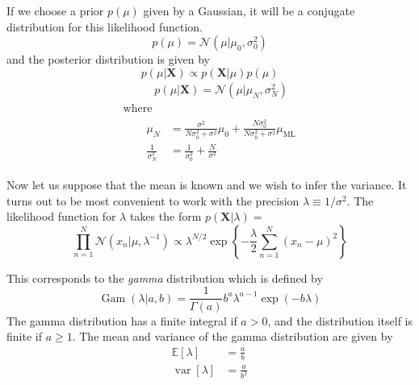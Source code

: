 \documentclass[5p,sort&compress]{elsarticle}
\begin{document}
If we choose a prior $p(\mu)$ given by a Gaussian, it will be a conjugate distribution for this likelihood function. 
\begin{equation}
p(\mu) =\mathcal{N}\left(\mu | \mu_{0}, \sigma_{0}^{2}\right)
\end{equation}
and the posterior distribution is given by
\begin{equation}
p(\mu | \mathbf{X}) \propto p(\mathbf{X} | \mu) p(\mu) 
\end{equation}
\begin{equation}
\begin{array}{l}{~~~~~\qquad p(\mu | \mathbf{X})=\mathcal{N}\left(\mu | \mu_{N}, \sigma_{N}^{2}\right)} \\ {\text { where }} \\ {\qquad \begin{aligned} \mu_{N} &=\frac{\sigma^{2}}{N \sigma_{0}^{2}+\sigma^{2}} \mu_{0}+\frac{N \sigma_{0}^{2}}{N \sigma_{0}^{2}+\sigma^{2}} \mu_{\mathrm{ML}} \\ \frac{1}{\sigma_{N}^{2}} &=\frac{1}{\sigma_{0}^{2}}+\frac{N}{\sigma^{2}} \end{aligned}}\end{array}
\end{equation}

Now let us suppose that the mean is known and we wish to infer the variance. It turns out to be most convenient to work with the precision $\lambda \equiv 1/\sigma^2$. The likelihood function for $\lambda$ takes the form $p(\mathbf{X} | \lambda)=$
\begin{equation}\label{eqn:pxl}
\prod_{n=1}^{N} \mathcal{N}\left(x_{n} | \mu, \lambda^{-1}\right) \propto \lambda^{N / 2} \exp \left\{-\frac{\lambda}{2} \sum_{n=1}^{N}\left(x_{n}-\mu\right)^{2}\right\}
\end{equation}

This corresponds to the \textit{gamma} distribution which is defined by 
\begin{equation}
\operatorname{Gam}(\lambda | a, b)=\frac{1}{\Gamma(a)} b^{a} \lambda^{a-1} \exp (-b \lambda)
\end{equation}
The gamma distribution has a finite integral if $a > 0$, and the distribution itself is finite if $a \geq 1$. The mean and variance of the gamma distribution are given by
\begin{equation}
\begin{aligned} \mathbb{E}[\lambda] &=\frac{a}{b} \\ \operatorname{var}[\lambda] &=\frac{a}{b^{2}} \end{aligned}
\end{equation}
\end{document}
